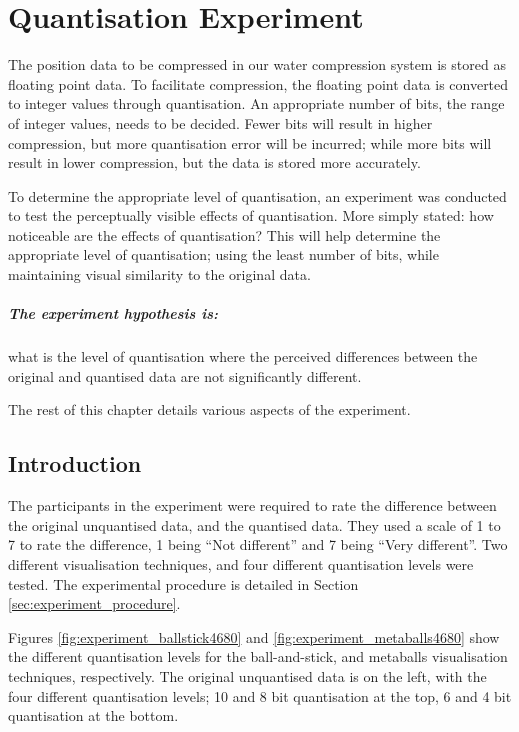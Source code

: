 \graphicspath{{./experiment/}}

\chapter{Quantisation Experiment}
\label{cha:experiment}

The position data to be compressed in our water compression system is stored as
floating point data. To facilitate compression, the floating point data is
converted to integer values through quantisation. An appropriate number of
bits, the range of integer values, needs to be decided. Fewer bits will result
in higher compression, but more quantisation error will be incurred; while more
bits will result in lower compression, but the data is stored more accurately.

To determine the appropriate level of quantisation, an experiment was conducted
to test the perceptually visible effects of quantisation. More simply stated:
how noticeable are the effects of quantisation? This will help determine the
appropriate level of quantisation; using the least number of bits, while
maintaining visual similarity to the original data.

\paragraph{The experiment hypothesis is:} what is the level of quantisation where the
perceived differences between the original and quantised data are not
significantly different.

The rest of this chapter details various aspects of the experiment.

\section{Introduction}
\label{sec:experiment_introduction}

The participants in the experiment were required to rate the difference between
the original unquantised data, and the quantised data. They used a scale of 1
to 7 to rate the difference, 1 being ``Not different'' and 7 being ``Very
different''. Two different visualisation techniques, and four different
quantisation levels were tested. The experimental procedure is detailed in
Section \ref{sec:experiment_procedure}.

Figures \ref{fig:experiment_ballstick4680} and
\ref{fig:experiment_metaballs4680} show the different quantisation levels for
the ball-and-stick, and metaballs visualisation techniques, respectively. The
original unquantised data is on the left, with the four different quantisation
levels; 10 and 8 bit quantisation at the top, 6 and 4 bit quantisation at the
bottom.


